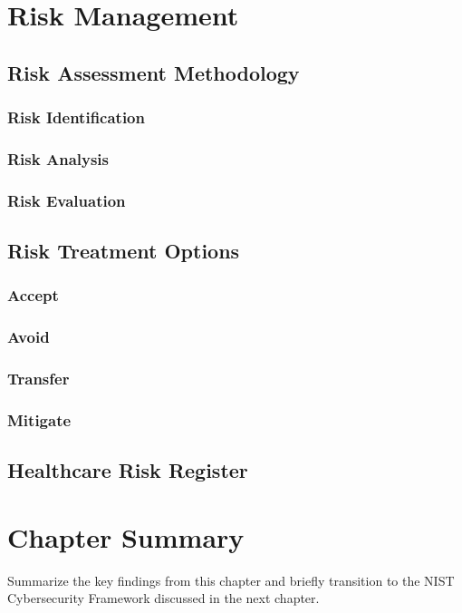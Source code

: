 \section{Risk Management}


\subsection{Risk Assessment Methodology}

\subsubsection{Risk Identification}

\subsubsection{Risk Analysis}

\subsubsection{Risk Evaluation}


\subsection{Risk Treatment Options}

\subsubsection{Accept}

\subsubsection{Avoid}

\subsubsection{Transfer}

\subsubsection{Mitigate}


\subsection{Healthcare Risk Register}



\section*{Chapter Summary}

Summarize the key findings from this chapter and briefly transition to the NIST Cybersecurity Framework discussed in the next chapter.